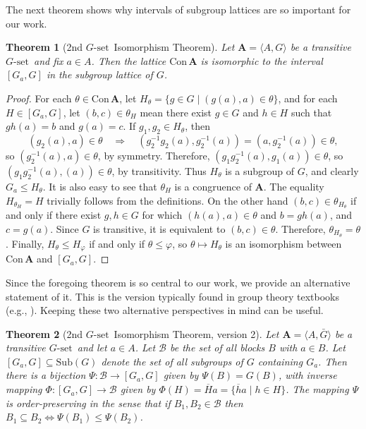 \documentclass[cm,dissertation]{uhthesis}
\theoremstyle{plain}
\newtheorem{theorem}{Theorem}[section]
\theoremstyle{definition}
\theoremstyle{remark}
\numberwithin{theorem}{section}
\numberwithin{claim}{chapter}
\numberwithin{equation}{section}
\numberwithin{conjecture}{chapter}
\newcommand{\<}{\ensuremath{\langle}}
\renewcommand{\>}{\ensuremath{\rangle}}
\renewcommand{\leq}{\ensuremath{\leqslant}}
\newcommand{\Con}{\ensuremath{\mathrm{Con\,}}}
\newcommand{\Sub}{\ensuremath{\mathrm{Sub}}}
\newcommand{\0}{\ensuremath{\mathbf{0}}}
\newcommand{\1}{\ensuremath{\mathbf{1}}}
\newcommand{\2}{\ensuremath{\mathbf{2}}}
\newcommand{\3}{\ensuremath{\mathbf{3}}}
\newcommand{\4}{\ensuremath{\mathbf{4}}}
\newcommand{\5}{\ensuremath{\mathbf{5}}}
\newcommand{\bA}{\ensuremath{\mathbf{A}}}
\newcommand{\sB}{\ensuremath{\mathscr{B}}}
\newcommand{\barG}{\ensuremath{\bar{G}}}
\newcommand{\barH}{\ensuremath{\overline{H}}}
\newcommand{\barh}{\ensuremath{\overline{h}}}
\newcommand{\stab}[1]{\ensuremath{G_{#1}}}
\newcommand{\Gset}{\ensuremath{G\text{-set}}}
\renewcommand{\phi}{\ensuremath{\varphi}}
\begin{document}
The next theorem shows why intervals of subgroup lattices are so important for
our work.
\begin{theorem}[2nd \Gset\ Isomorphism Theorem]
\label{thm:g-set-isomorphism2}
  Let $\bA = \<A, G\>$ be a transitive \Gset\ and fix $a\in A$.  
  Then the lattice $\Con \bA$ is isomorphic to the
  interval $[G_a, G]$ in the subgroup lattice of $G$.
\end{theorem}
\begin{proof}
    For each $\theta  \in \Con \bA$, let $H_\theta =\{g\in G \mid (g(a),a) \in
    \theta\}$,  
    and for each $H \in [G_a, G]$, let 
    $(b, c) \in \theta_H$ mean there exist $g \in G$ and $h \in H$ 
    such that $gh(a) = b$ and $g(a) =c$. 
    If $g_1, g_2 \in H_\theta$, then 
    \[
    (g_2(a), a) \in \theta \quad \Rightarrow \quad (g_2^{-1} g_2(a), g_2^{-1}(a)) =
    (a, g_2^{-1}(a)) \in \theta,
    \]
    so $(g_2^{-1}(a), a) \in \theta$, by symmetry.  Therefore,
    $(g_1g_2^{-1} (a), g_1 (a)) \in \theta$, so 
    $(g_1g_2^{-1} (a), (a)) \in \theta$, by transitivity. Thus $H_\theta$ is a
    subgroup of 
    $G$, and clearly  $G_a \leq H_\theta$. 
    It is also easy to see that $\theta_H$ is a congruence of $\bA$.
    The equality $H_{\theta_H}=H$ trivially follows from the definitions. 
    On the other hand $(b, c) \in \theta_{H_\theta}$ if and only if there exist 
    $g, h\in G$ for which $(h(a),a) \in \theta$ and
    $b = gh(a)$, and $c = g(a)$. Since $G$ is transitive, it is equivalent 
    to $(b, c) \in \theta$.
    Therefore, $\theta_{H_\theta} = \theta$. Finally, $H_\theta \leq H_\phi$ if
    and only if
    $\theta \leq \phi$, so $\theta \mapsto H_\theta$ is an isomorphism
    between $\Con \bA$ and $[G_a, G]$.
\end{proof}

Since the foregoing theorem is so central to our work, we provide an alternative 
statement of it. This is the version typically found in group theory 
textbooks (e.g., \cite{Dixon:1996}).  Keeping these two alternative perspectives in
mind can be useful.

  \begin{theorem}[2nd \Gset\ Isomorphism Theorem, version 2]
    Let $\bA = \<A, \barG\>$ be a transitive \Gset\
    and let $a \in A$. Let $\sB$ be the set of all blocks $B$ with $a\in B$.
    Let $[\stab{a},G] \subseteq \Sub(G)$ denote the set of all subgroups of 
    $G$ containing $\stab{a}$.  Then there is a
    bijection $\Psi :\sB \rightarrow [\stab{a},G]$ given by $\Psi(B)= G(B)$,
    with inverse mapping $\Phi: [\stab{a},G] \rightarrow \sB $ 
    given by $\Phi(H) = \barH a = \{\barh a  \mid  h\in H\}$. 
    The mapping $\Psi$ is order-preserving in the sense
    that if $B_1, B_2 \in  \sB$ then 
    $B_1\subseteq B_2 \Leftrightarrow \Psi(B_1) \leq \Psi(B_2)$.
  \end{theorem}
\end{document}

